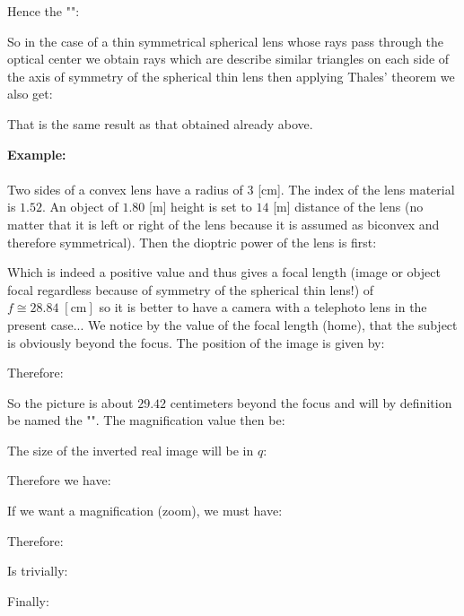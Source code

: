 	Hence the "":
	
	So in the case of a thin symmetrical spherical lens whose rays pass through the optical center we obtain rays which are describe similar triangles on each side of the axis of symmetry of the spherical thin lens then applying Thales' theorem we also get:
	
	That is the same result as that obtained already above.
	\begin{tcolorbox}[colframe=black,colback=white,sharp corners]
	\textbf{{\Large {}}Example:}\\\\
	Two sides of a convex lens have a radius of $3$ [cm]. The index of the lens material is $1.52$. An object of $1.80$ [m] height is set to $14$ [m] distance of the lens (no matter that it is left or right of the lens because it is assumed as biconvex and therefore symmetrical). Then the dioptric power of the lens is first:
	
	Which is indeed a positive value and thus gives a focal length (image or object focal regardless because of symmetry of the spherical thin lens!) of	$f\cong 28.84\;[\text{cm}]$ so it is better to have a camera with a telephoto lens in the present case... We notice by the value of the focal length (home), that the subject is obviously beyond the focus. The position of the image is given by:
	
	Therefore:
	
	So the picture is about $29.42$ centimeters beyond the focus and will by definition be named the "". The magnification value then be:
	
	The size of the inverted real image will be in $q$:
	
	\end{tcolorbox}
	Therefore we have:
	
	If we want a magnification (zoom), we must have:
	
	Therefore:
		
	Is trivially:
	
	Finally:
	
